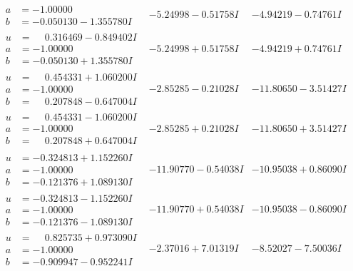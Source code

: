 \documentclass[1p]{elsarticle_modified}
\theoremstyle{definition}
\begin{document}
$$\begin{array}{c|c|c}
\begin{aligned}
a &= -1.00000\phantom{ +0.000000I} \\
b &= -0.050130 - 1.355780 I\end{aligned}
 & -5.24998 - 0.51758 I & -4.94219 - 0.74761 I \\ \hline\begin{aligned}
u &= \phantom{-}0.316469 - 0.849402 I \\
a &= -1.00000\phantom{ +0.000000I} \\
b &= -0.050130 + 1.355780 I\end{aligned}
 & -5.24998 + 0.51758 I & -4.94219 + 0.74761 I \\ \hline\begin{aligned}
u &= \phantom{-}0.454331 + 1.060200 I \\
a &= -1.00000\phantom{ +0.000000I} \\
b &= \phantom{-}0.207848 - 0.647004 I\end{aligned}
 & -2.85285 - 0.21028 I & -11.80650 - 3.51427 I \\ \hline\begin{aligned}
u &= \phantom{-}0.454331 - 1.060200 I \\
a &= -1.00000\phantom{ +0.000000I} \\
b &= \phantom{-}0.207848 + 0.647004 I\end{aligned}
 & -2.85285 + 0.21028 I & -11.80650 + 3.51427 I \\ \hline\begin{aligned}
u &= -0.324813 + 1.152260 I \\
a &= -1.00000\phantom{ +0.000000I} \\
b &= -0.121376 + 1.089130 I\end{aligned}
 & -11.90770 - 0.54038 I & -10.95038 + 0.86090 I \\ \hline\begin{aligned}
u &= -0.324813 - 1.152260 I \\
a &= -1.00000\phantom{ +0.000000I} \\
b &= -0.121376 - 1.089130 I\end{aligned}
 & -11.90770 + 0.54038 I & -10.95038 - 0.86090 I \\ \hline\begin{aligned}
u &= \phantom{-}0.825735 + 0.973090 I \\
a &= -1.00000\phantom{ +0.000000I} \\
b &= -0.909947 - 0.952241 I\end{aligned}
 & -2.37016 + 7.01319 I & -8.52027 - 7.50036 I \\ \hline\begin{aligned}

\end{aligned}
\end{array}$$
\end{document}

